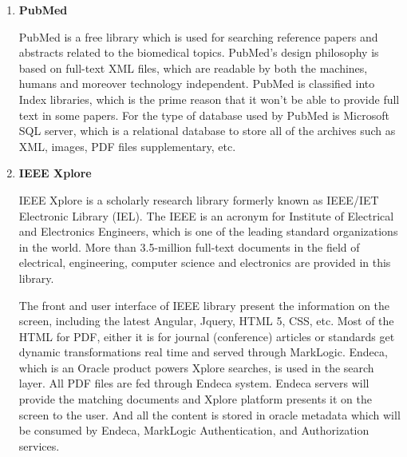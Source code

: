 \begin{enumerate}
	
	\item\textbf{PubMed}
	\setlength{\parindent}{1em}
		
	 PubMed is a free library which is used for searching reference papers and abstracts related to the biomedical topics.
	 PubMed’s design philosophy is based on full-text XML files, which are readable by both the machines, humans and moreover technology independent.
	 PubMed is classified into Index libraries, which is the prime reason that it won’t be able to provide full text in some papers.
	 For the type of database used by PubMed is Microsoft SQL server, which is a relational database to store all of the archives such as XML, images, PDF files supplementary, etc. 
		
	\item\textbf{IEEE Xplore}
	\setlength{\parindent}{1em}
	
	IEEE Xplore is a scholarly research library formerly known as IEEE/IET Electronic Library (IEL).
	The IEEE is an acronym for Institute of Electrical and Electronics Engineers, which is one of the leading standard organizations in the world.
	More than 3.5-million full-text documents in the field of electrical, engineering, computer science and electronics are provided in this library. 
	
	The front and user interface of IEEE library present the information on the screen, including the latest Angular, Jquery, HTML 5, CSS, etc. 
	Most of the HTML for PDF, either it is for journal (conference) articles or standards get dynamic transformations real time and served through MarkLogic.
	Endeca, which is an Oracle product powers Xplore searches, is used in the search layer.
	All PDF files are fed through Endeca system.
	Endeca servers will provide the matching documents and Xplore platform presents it on the screen to the user.
	And all the content is stored in oracle metadata which will be consumed by Endeca, MarkLogic Authentication, and Authorization services.
	
\end{enumerate}


